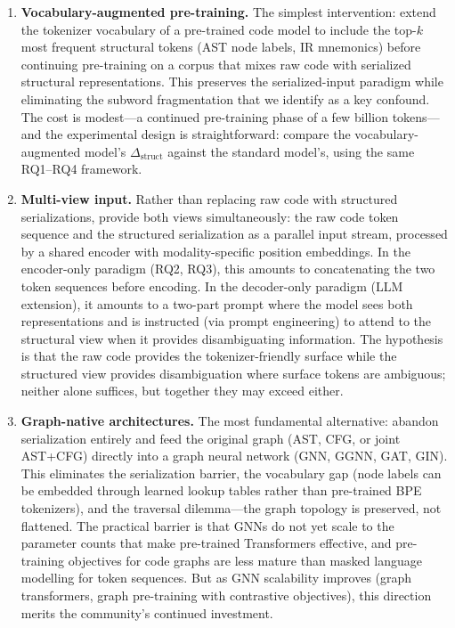 \documentclass[pdflatex,sn-mathphys,Numbered]{sn-jnl}
\begin{document}
\begin{enumerate}

\item \textbf{Vocabulary-augmented pre-training.} The simplest intervention: extend the tokenizer vocabulary of a pre-trained code model to include the top-$k$ most frequent structural tokens (AST node labels, IR mnemonics) before continuing pre-training on a corpus that mixes raw code with serialized structural representations. This preserves the serialized-input paradigm while eliminating the subword fragmentation that we identify as a key confound. The cost is modest---a continued pre-training phase of a few billion tokens---and the experimental design is straightforward: compare the vocabulary-augmented model's $\Delta_{\text{struct}}$ against the standard model's, using the same RQ1--RQ4 framework.

\item \textbf{Multi-view input.} Rather than replacing raw code with structured serializations, provide both views simultaneously: the raw code token sequence and the structured serialization as a parallel input stream, processed by a shared encoder with modality-specific position embeddings. In the encoder-only paradigm (RQ2, RQ3), this amounts to concatenating the two token sequences before encoding. In the decoder-only paradigm (LLM extension), it amounts to a two-part prompt where the model sees both representations and is instructed (via prompt engineering) to attend to the structural view when it provides disambiguating information. The hypothesis is that the raw code provides the tokenizer-friendly surface while the structured view provides disambiguation where surface tokens are ambiguous; neither alone suffices, but together they may exceed either.

\item \textbf{Graph-native architectures.} The most fundamental alternative: abandon serialization entirely and feed the original graph (AST, CFG, or joint AST+CFG) directly into a graph neural network (GNN, GGNN, GAT, GIN). This eliminates the serialization barrier, the vocabulary gap (node labels can be embedded through learned lookup tables rather than pre-trained BPE tokenizers), and the traversal dilemma---the graph topology is preserved, not flattened. The practical barrier is that GNNs do not yet scale to the parameter counts that make pre-trained Transformers effective, and pre-training objectives for code graphs are less mature than masked language modelling for token sequences. But as GNN scalability improves (graph transformers, graph pre-training with contrastive objectives), this direction merits the community's continued investment.

\end{enumerate}
\end{document}
